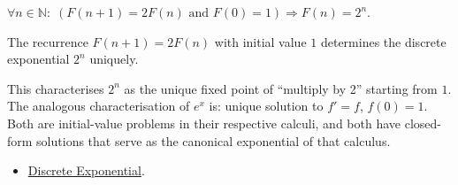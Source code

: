 \begin{remark*}
\(\forall n \in \mathbb{N}:\;
(F(n+1) = 2F(n)\text{ and }F(0)=1) \Rightarrow F(n) = 2^n\).
\end{remark*}

\begin{remark*}[Interpretation]
The recurrence \(F(n+1)=2F(n)\) with initial value \(1\) determines the
discrete exponential \(2^n\) uniquely.


This characterises \(2^n\) as the unique fixed point of ``multiply by 2''
starting from \(1\). The analogous characterisation of \(e^x\) is: unique
solution to \(f' = f\), \(f(0) = 1\). Both are initial-value problems in
their respective calculi, and both have closed-form solutions that serve as
the canonical exponential of that calculus.
\end{remark*}


\begin{dependencies}
\begin{itemize}
  \item \hyperref[def:discrete-exponential]{Discrete Exponential}.
\end{itemize}
\end{dependencies}
